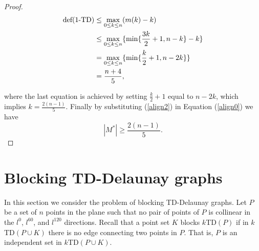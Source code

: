 \documentclass[11pt,a4paper]{article}
\newcommand{\kTD}[2]{$#1$\text{-}TD#2}
\begin{document}
\begin{proof}
\begin{align}
\label{align2}
\text{def}(\text{\kTD{1}{}})&\le \max\limits_{0\le k\le n}(m(k)-k)\nonumber\\
&\le \max\limits_{0\le k\le n}\{\min\{\frac{3k}{2}+1, n-k\}-k\}\nonumber\\
&= \max\limits_{0\le k\le n}\{\min\{\frac{k}{2}+1, n-2k\}\}\nonumber\\
&= \frac{n+4}{5},
\end{align}

where the last equation is achieved by setting $\frac{k}{2}+1$ equal to $n-2k$, which implies $k=\frac{2(n-1)}{5}$. Finally by substituting (\ref{align2}) in Equation (\ref{align0}) we have
$$
|M^*|\ge \frac{2(n-1)}{5}.
$$
\end{proof}
\section{Blocking TD-Delaunay graphs}
\label{blocking-section}
In this section we consider the problem of blocking TD-Delaunay graphs. Let $P$ be a set of $n$ points in the plane such that no pair of points of $P$ is collinear in the $l^{0}$, $l^{60}$, and $l^{120}$ directions. Recall that a point set $K$ blocks \kTD{k}{$(P)$} if in \kTD{k}{$(P\cup K)$} there is no edge connecting two points in $P$. That is, $P$ is an independent set in \kTD{k}{$(P\cup K)$}.
\end{document}
